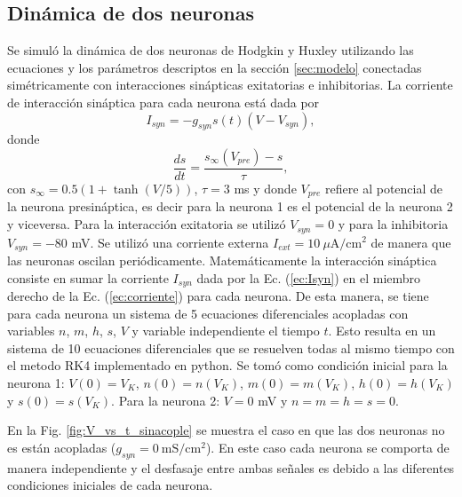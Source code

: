 \documentclass[11pt,twocolumn,twoside]{opticajnl}
\begin{document}
\subsection{Dinámica de dos neuronas}

\vspace{0.3cm}

Se simuló la dinámica de dos neuronas de Hodgkin y Huxley utilizando las ecuaciones y los parámetros descriptos en la sección \ref{sec:modelo} conectadas simétricamente con interacciones sinápticas exitatorias e inhibitorias. La corriente de interacción sináptica para cada neurona está dada por 
\begin{equation}
    I_{syn} = -g_{syn} s(t) (V-V_{syn}),
    \label{ec:Isyn}
\end{equation}
donde
\begin{equation}
    \frac{ds}{dt} = \frac{s_{\infty}(V_{pre}) - s}{\tau},
\end{equation}
con $s_{\infty} = 0.5 (1 + \tanh(V/5))$, $\tau = 3$ ms y donde $V_{pre}$ refiere al potencial de la neurona presináptica, es decir para la neurona 1 es el potencial de la neurona 2 y viceversa. Para la interacción exitatoria se utilizó $V_{syn}= 0$ y para la inhibitoria $V_{syn} = -80$ mV. Se utilizó una corriente externa $I_{ext} = 10 ~\mu\text{A}/\text{cm}^2$ de manera que las neuronas oscilan periódicamente. Matemáticamente la interacción sináptica consiste en sumar la corriente $I_{syn}$ dada por la Ec. (\ref{ec:Isyn}) en el miembro derecho de la Ec. (\ref{ec:corriente}) para cada neurona. De esta manera, se tiene para cada neurona un sistema de 5 ecuaciones diferenciales acopladas con variables $n$, $m$, $h$, $s$, $V$ y variable independiente el tiempo $t$. Esto resulta en un sistema de 10 ecuaciones diferenciales que se resuelven todas al mismo tiempo con el metodo RK4 implementado en python. Se tomó como condición inicial para la neurona 1: $V(0) = V_K$, $n(0) = n(V_K)$, $m(0) = m(V_K)$, $h(0) = h(V_K)$ y $s(0) = s(V_K)$. Para la neurona 2: $V=0$ mV y $n=m=h=s=0$.

\newpage

En la Fig. \ref{fig:V_vs_t_sinacople} se muestra el caso en que las dos neuronas no es están acopladas ($g_{syn} = 0 ~\text{mS}/\text{cm}^2$). En este caso cada neurona se comporta de manera independiente y el desfasaje entre ambas señales es debido a las diferentes condiciones iniciales de cada neurona.
\end{document}
